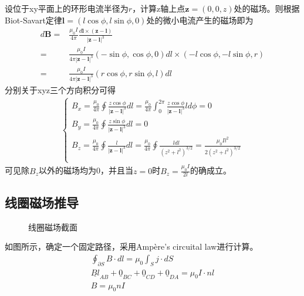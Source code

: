 设位于xy平面上的环形电流半径为$r$，计算z轴上点$\mathbf{z}=(0,0,z)$处的磁场。则根据Biot-Savart定律$\mathbf{l}=(l\cos\phi,l\sin\phi,0)$处的微小电流产生的磁场即为
\begin{align*}
    d\mathbf{B}=&\frac{\mu_0I}{4\pi}\frac{d\mathbf{l}\times(\mathbf{z}-\mathbf{l})}{|\mathbf{z}-\mathbf{l}|^3}\\
    =&\frac{\mu_0I}{4\pi|\mathbf{z}-\mathbf{l}|^3}(-\sin\phi,\cos\phi,0)dl\times(-l\cos\phi,-l\sin\phi,r)\\
    =&\frac{\mu_0I}{4\pi|\mathbf{z}-\mathbf{l}|^3}(r\cos\phi,r\sin\phi,l)dl
\end{align*}
分别关于xyz三个方向积分可得
\begin{align*}
    \begin{cases}
        B_x=\frac{\mu_0}{4\pi}\oint\frac{z\cos\phi}{|\mathbf{z}-\mathbf{l}|^3}dl
        =\frac{\mu_0}{4\pi}\int_0^{2\pi}\frac{z\cos\phi}{|\mathbf{z}-\mathbf{l}|^3}ld\phi=0\\
        B_y=\frac{\mu_0}{4\pi}\oint\frac{z\sin\phi}{|\mathbf{z}-\mathbf{l}|^3}dl=0\\
        B_z=\frac{\mu_0}{4\pi}\oint\frac{l}{|\mathbf{z}-\mathbf{l}|^3}dl
        =\frac{\mu_0}{4\pi}\oint\frac{ldl}{(z^2+l^2)^{3/2}}=\frac{\mu_0Il^2}{2(z^2+l^2)^{3/2}}\\
    \end{cases}
\end{align*}
可见除$B_z$以外的磁场均为0，并且当$z=0$时$B_z=\frac{\mu_0I}{2l}$的确成立。

\subsection{线圈磁场推导}

\begin{figure}[ht!]
    \centering
    \caption{线圈磁场截面}
\end{figure}
如图所示，确定一个固定路径，采用Ampère's circuital law进行计算。
\begin{gather*}
    \oint_{\partial S}B\cdot dl=\mu_0\int_Sj\cdot dS\\
    \underline{Bl}_{AB}+\underline{0}_{BC}+\underline{0}_{CD}+\underline{0}_{DA}=\mu_0I\cdot nl\\
    B=\mu_0nI
\end{gather*}

